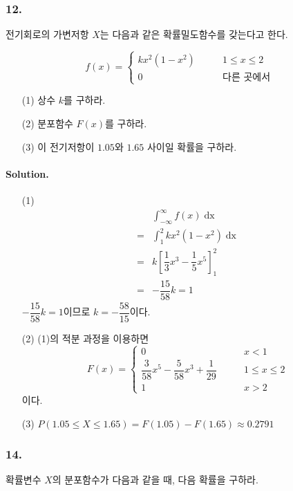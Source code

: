 \subsubsection{12.} 전기회로의 가변저항 $X$는 다음과 같은 확률밀도함수를 갖는다고 한다.

\[f\left(x\right) = \left\{
\begin{array}{ll}
	kx^2\left(1-x^2\right) & \qquad 1\leq x\leq 2 \\
	0 & \qquad\textrm{다른 곳에서}
\end{array}
\right. \]

\begin{itemize}
  \item [(1)] 상수 $k$를 구하라.
  \item [(2)] 분포함수 $F\left(x\right)$를 구하라.
  \item [(3)] 이 전기저항이 $1.05$와 $1.65$ 사이일 확률을 구하라.
\end{itemize}

\paragraph{Solution.}
\begin{itemize}
  \item [(1)] \begin{align*}
 	&\int_{-\infty}^{\infty} f\left(x\right) \mathop{dx}\\
 	=& \int_{1}^{2} kx^2\left(1-x^2\right) \mathop{dx}\\
 	=& k \left[\dfrac{1}{3}x^3 - \dfrac{1}{5} x^5\right]_1^2\\
 	=& -\dfrac{15}{58}k = 1
  \end{align*}
  $-\dfrac{15}{58}k = 1$이므로 $k = -\dfrac{58}{15}$이다.\\
  \item[(2)] (1)의 적분 과정을 이용하면 \[F\left(x\right) = \left\{
\begin{array}{ll}
	0 & \qquad x < 1\\
	\dfrac{3}{58} x^5 - \dfrac{5}{58} x^3 + \dfrac{1}{29} & \qquad 1\leq x\leq 2 \\
	1 & \qquad x > 2
\end{array}
\right. \]
	이다.
  \item[(3)] $P\left(1.05\leq X\leq 1.65\right) = F\left(1.05\right) - F\left(1.65\right) \approx 0.2791$
\end{itemize}

\subsubsection{14.} 확률변수 $X$의 분포함수가 다음과 같을 때, 다음 확률을 구하라.

